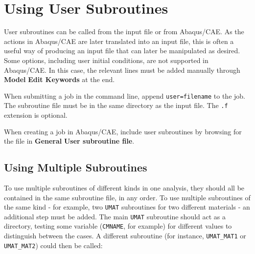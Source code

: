 \documentclass[10pt,letterpaper,oneside]{report}
\begin{document}








\section{Using User Subroutines}
User subroutines can be called from the input file or from Abaqus/CAE.  As the actions in Abaqus/CAE are later translated into an input file, this is often a useful way of producing an input file that can later be manipulated as desired. Some options, including user initial conditions, are not supported in Abaqus/CAE.  In this case, the relevant lines must be added manually through \textbf{Model} \textrightarrow \textbf{Edit Keywords} at the end.

When submitting a job in the command line, append \texttt{user=filename} to the job.  The subroutine file must be in the same directory as the input file.  The \texttt{.f} extension is optional.  

When creating a job in Abaqus/CAE, include user subroutines by browsing for the file in \textbf{General} \textrightarrow \textbf{User subroutine file}.


\subsection{Using Multiple Subroutines}
\label{subsec:multiple}
To use multiple subroutines of different kinds in one analysis, they should all be contained in the same subroutine file, in any order.  To use multiple subroutines of the same kind - for example, two \texttt{UMAT} subroutines for two different materials - an additional step must be added.  The main \texttt{UMAT} subroutine should act as a directory, testing some variable (\texttt{CMNAME}, for example) for different values to distinguish between the cases.  A different subroutine (for instance, \texttt{UMAT\_MAT1} or \texttt{UMAT\_MAT2}) could then be called:
\end{document}
